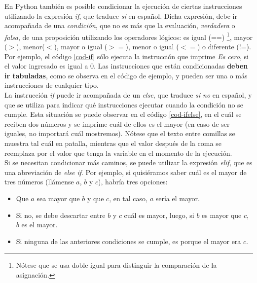 \newpage



En Python también es posible condicionar la ejecución de ciertas instrucciones utilizando la expresión \emph{if}, que traduce \emph{si} en español. Dicha expresión, debe ir acompañada de una \emph{condición}, que no es más que la evaluación, \emph{verdadera} o \emph{falsa}, de una proposición utilizando los operadores lógicos: es igual (==) \footnote{Nótese que se usa doble igual para distinguir la comparación de la asignación.}, mayor ($>$), menor($<$), mayor o igual ($>=$), menor o igual ($<=$) o diferente (!=). Por ejemplo, el código \ref{cod-if} sólo ejecuta la instrucción que imprime \emph{Es cero}, si  el valor ingresado es igual a 0. Las instrucciones que están condicionadas \textbf{deben ir tabuladas}, como se observa en el código de ejemplo, y pueden ser una o más instrucciones de cualquier tipo. \\




La instrucción \emph{if} puede ir acompañada de un \emph{else}, que traduce \emph{si no} en español, y que se utiliza para indicar qué instrucciones ejecutar cuando la condición no se cumple. Esta situación se puede observar en el código \ref{cod-ifelse}, en el cuál se reciben dos números y se imprime cuál de ellos es el mayor (en caso de ser iguales, no importará cuál mostremos). Nótese que el texto entre comillas se muestra tal cuál en patalla, mientras que el valor después de la coma se reemplaza por el valor que tenga la variable en el momento de la ejecución. \\



Si se necesitan condicionar más caminos, se puede utilizar la expresión \emph{elif}, que es una abreviación de \emph{else if}. Por ejemplo, si quisiéramos saber cuál es el mayor de tres números (llámense $a$, $b$ y $c$), habría tres opciones: 
\begin{itemize}
\item Que $a$ sea mayor que $b$ y que $c$, en tal caso, $a$ sería el mayor.

\item Si no, se debe descartar entre $b$ y $c$ cuál es mayor, luego, si $b$ es mayor que $c$, $b$ es el mayor.

\item Si ninguna de las anteriores condiciones se cumple, es porque el mayor era $c$. 
\end{itemize}


